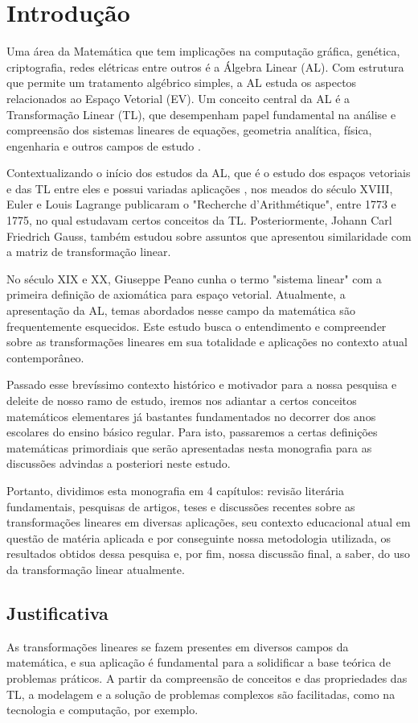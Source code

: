 \chapter{Introdução}
Uma área da Matemática que tem implicações na computação gráfica, genética, criptografia, redes elétricas entre outros é a Álgebra Linear (AL). Com estrutura que permite um tratamento algébrico simples, a AL estuda os aspectos relacionados ao Espaço Vetorial (EV). Um conceito central da AL é a Transformação Linear (TL), que desempenham papel fundamental na análise e compreensão dos sistemas lineares de equações, geometria analítica, física, engenharia e outros campos de estudo \cite{figueiredo2009}.

Contextualizando o início dos estudos da AL, que é o estudo dos espaços vetoriais e das TL entre eles e possui variadas aplicações \cite{souzasilzaeliza2017}, nos meados do século XVIII, Euler e Louis Lagrange publicaram o "Recherche d'Arithmétique", entre 1773 e 1775, no qual estudavam certos conceitos da TL. Posteriormente, Johann Carl Friedrich Gauss, também estudou sobre assuntos que apresentou similaridade com a matriz de transformação linear.

No século XIX e XX, Giuseppe Peano cunha o termo "sistema linear" com a primeira definição de axiomática para espaço vetorial. Atualmente, a apresentação da AL, temas abordados nesse campo da matemática são frequentemente esquecidos. Este estudo busca o entendimento e compreender sobre as transformações lineares em sua totalidade e aplicações no contexto atual contemporâneo.

Passado esse brevíssimo contexto histórico e motivador para a nossa pesquisa e deleite de nosso ramo de estudo, iremos nos adiantar a certos conceitos matemáticos elementares já bastantes fundamentados no decorrer dos anos escolares do ensino básico regular. Para isto, passaremos a certas definições matemáticas primordiais que serão apresentadas nesta monografia para as discussões advindas a posteriori neste estudo.

Portanto, dividimos esta monografia em 4 capítulos: revisão literária fundamentais, pesquisas de artigos, teses e discussões recentes sobre as transformações lineares em diversas aplicações, seu contexto educacional atual em questão de matéria aplicada e por conseguinte nossa metodologia utilizada, os resultados obtidos dessa pesquisa e, por fim, nossa discussão final, a saber, do uso da transformação linear atualmente.

\section{Justificativa}
As transformações lineares se fazem presentes em diversos campos da matemática, e sua aplicação é fundamental para a solidificar a base teórica de problemas práticos. A partir da compreensão de conceitos e das propriedades das TL, a modelagem e a solução de problemas complexos são facilitadas, como na tecnologia e computação, por exemplo.

